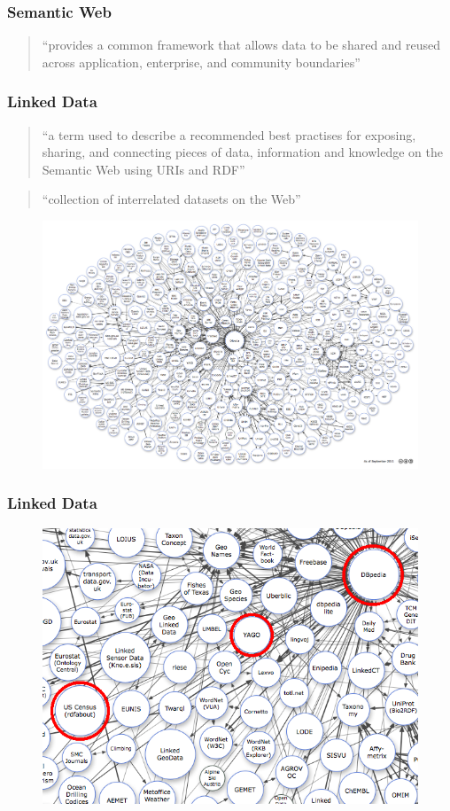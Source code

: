 \documentclass{beamer}
\begin{document}
\begin{frame}
\frametitle{Semantic Web}
\begin{quote}
 ``provides a common framework that allows data to be shared and reused across application, enterprise, and community
boundaries''
\end{quote}
\end{frame}
\begin{frame}
\frametitle{Linked Data}
\begin{quote}
 ``a term used to describe a recommended best practises for exposing, sharing, and connecting pieces of data,
information and knowledge on the Semantic Web using URIs and RDF''
\end{quote}
\begin{quote}
 ``collection of interrelated datasets on the Web''
\end{quote}
 \begin{figure}
 \includegraphics[width=0.65\linewidth]{./Figures/lod-datasets_2011-09-19}
 \end{figure}
\end{frame}
\begin{frame}
\frametitle{Linked Data}
 \begin{figure}
 \includegraphics[width=1\linewidth]{./Figures/lod-zoom}
 \end{figure}
\end{frame}
\end{document}

